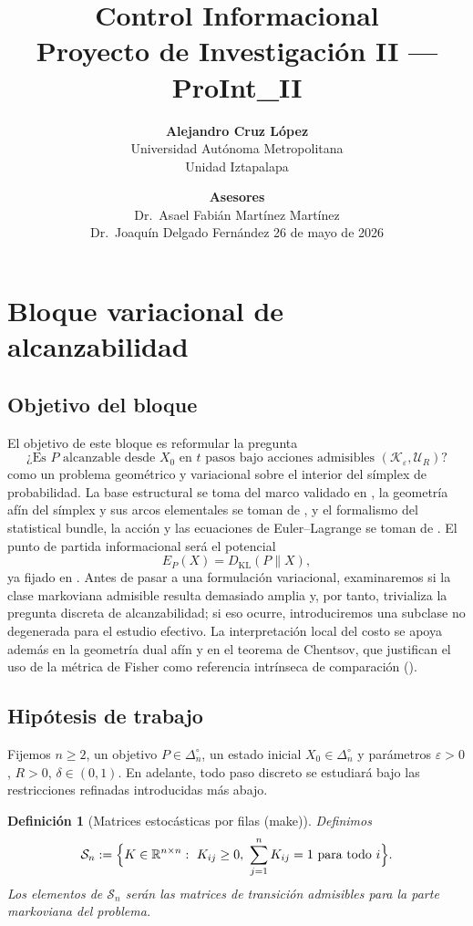 ﻿\documentclass[12pt]{article}
\title{Control Informacional\\
\large Proyecto de Investigación II --- ProInt\_II}
\author{
\textbf{Alejandro Cruz López} \\
Universidad Autónoma Metropolitana \\
Unidad Iztapalapa
}
\date{
\vspace{1em}
\textbf{Asesores} \\[0.3em]
Dr.\ Asael Fabián Martínez Martínez \\
Dr.\ Joaquín Delgado Fernández
\vspace{1em}
26 de mayo de 2026
}
\newcommand{\fuente}[1]{\textnormal{(#1)}}
\newtheorem{definicion}{Definición}[section]
\begin{document}
\maketitle

\section{Bloque variacional de alcanzabilidad}

\subsection{Objetivo del bloque}
El objetivo de este bloque es reformular la pregunta
\[
\text{¿Es }P\text{ alcanzable desde }X_0\text{ en }t\text{ pasos bajo acciones admisibles }(\mathcal K_\varepsilon,\mathcal U_R)?
\]
como un problema geométrico y variacional sobre el interior del símplex de probabilidad. La base estructural se toma del marco validado en \cite{ControlInformacional2026}, la geometría afín del símplex y sus arcos elementales se toman de \cite{PistoneShoaib2024Axioms}, y el formalismo del statistical bundle, la acción y las ecuaciones de Euler--Lagrange se toman de \cite{Pistone2018Lagrangian}. El punto de partida informacional será el potencial
\[
E_P(X)=D_{\mathrm{KL}}(P\|X),
\]
ya fijado en \cite{ControlInformacional2026}. Antes de pasar a una formulación variacional, examinaremos si la clase markoviana admisible resulta demasiado amplia y, por tanto, trivializa la pregunta discreta de alcanzabilidad; si eso ocurre, introduciremos una subclase no degenerada para el estudio efectivo. La interpretación local del costo se apoya además en la geometría dual afín y en el teorema de Chentsov, que justifican el uso de la métrica de Fisher como referencia intrínseca de comparación (\cite{Chentsov1982,Amari2016}).

\subsection{Hipótesis de trabajo}
Fijemos \(n\ge 2\), un objetivo \(P\in\Delta_n^\circ\), un estado inicial \(X_0\in\Delta_n^\circ\) y parámetros \(\varepsilon>0\), \(R>0\), \(\delta\in(0,1)\). En adelante, todo paso discreto se estudiará bajo las restricciones refinadas introducidas más abajo.

\begin{definicion}[Matrices estocásticas por filas \fuente{make}]
Definimos
\[
\mathcal S_n:=\Bigl\{K\in\mathbb R^{n\times n}:\ K_{ij}\ge 0,\ \sum_{j=1}^n K_{ij}=1\text{ para todo }i\Bigr\}.
\]
Los elementos de \(\mathcal S_n\) serán las matrices de transición admisibles para la parte markoviana del problema.
\end{definicion}
\end{document}
